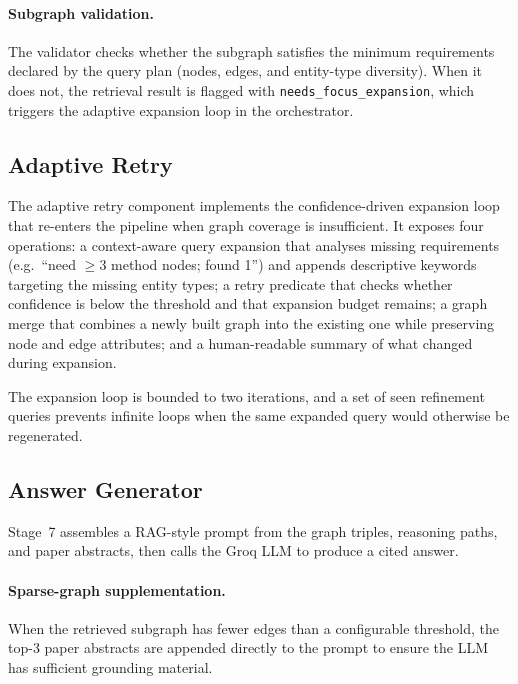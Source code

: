 \documentclass[11pt,a4paper]{article}
\begin{document}
\paragraph{Subgraph validation.}
The validator checks whether the subgraph satisfies the minimum requirements
declared by the query plan (nodes, edges, and entity-type diversity). When it
does not, the retrieval result is flagged with
\texttt{needs\_focus\_expansion}, which triggers the adaptive expansion loop
in the orchestrator.

\subsection{Adaptive Retry}

The adaptive retry component implements the confidence-driven expansion
loop that re-enters the pipeline when graph coverage is insufficient. It
exposes four operations: a context-aware query expansion that analyses
missing requirements (e.g.\ ``need $\geq 3$ method nodes; found 1'') and
appends descriptive keywords targeting the missing entity types; a retry
predicate that checks whether confidence is below the threshold and that
expansion budget remains; a graph merge that combines a newly built graph
into the existing one while preserving node and edge attributes; and a
human-readable summary of what changed during expansion.

The expansion loop is bounded to two iterations, and a set of seen refinement
queries prevents infinite loops when the same expanded query would otherwise
be regenerated.

\subsection{Answer Generator}

Stage~7 assembles a RAG-style prompt from the graph triples, reasoning paths,
and paper abstracts, then calls the Groq LLM to produce a cited answer.

\paragraph{Sparse-graph supplementation.}
When the retrieved subgraph has fewer edges than a configurable threshold,
the top-3 paper abstracts are appended directly to the prompt to ensure the
LLM has sufficient grounding material.
\end{document}
